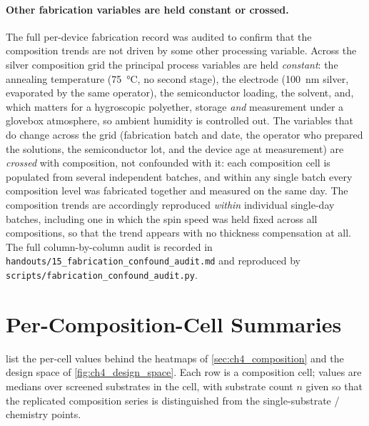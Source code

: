 \paragraph{Other fabrication variables are held constant or crossed.} The full
per-device fabrication record was audited to confirm that the composition trends
are not driven by some other processing variable. Across the silver composition
grid the principal process variables are held \emph{constant}: the annealing
temperature (\SI{75}{\celsius}, no second stage), the electrode (\SI{100}{\nano\meter}
silver, evaporated by the same operator), the semiconductor loading, the solvent,
and, which matters for a hygroscopic polyether, storage \emph{and} measurement
under a glovebox atmosphere, so ambient humidity is controlled out. The variables
that do change across the grid (fabrication batch and date, the operator who
prepared the solutions, the semiconductor lot, and the device age at measurement)
are \emph{crossed} with composition, not confounded with it: each
composition cell is populated from several independent batches, and within any
single batch every composition level was fabricated together and measured on the
same day. The composition trends are accordingly reproduced \emph{within}
individual single-day batches, including one in which the spin speed was held
fixed across all compositions, so that the trend appears with no thickness
compensation at all. The full column-by-column audit is recorded in
\texttt{handouts/15\_fabrication\_confound\_audit.md} and reproduced by
\texttt{scripts/fabrication\_confound\_audit.py}.

\section{Per-Composition-Cell Summaries}\label{app:ch4_celltables}

 list the per-cell values
behind the heatmaps of \cref{sec:ch4_composition} and the design space of
\cref{fig:ch4_design_space}. Each row is a composition cell; values are medians
over screened substrates in the cell, with substrate count \(n\) given so that
the replicated  composition series is distinguished from the
single-substrate / chemistry points.

